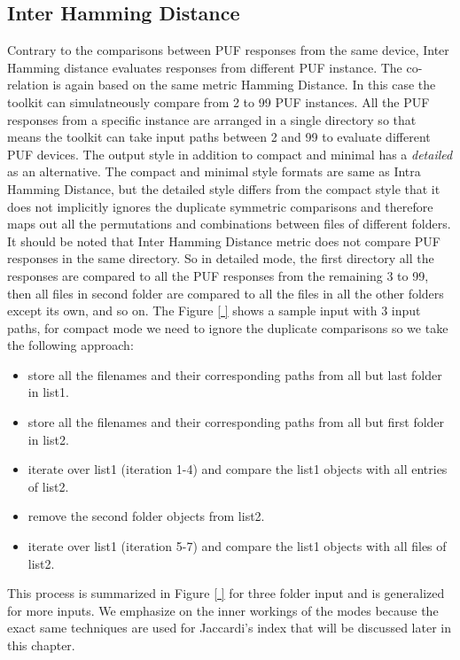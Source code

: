 \subsection{Inter Hamming Distance}
Contrary to the comparisons between PUF responses from the same device, Inter Hamming distance evaluates responses from different PUF instance. The co-relation is again based on the same metric Hamming Distance. In this case the toolkit can simulatneously compare from 2 to 99 PUF instances. All the PUF responses from a specific instance are arranged in a single directory so that means the toolkit can take input paths between 2 and 99 to evaluate different PUF devices. The output
style in addition to compact and minimal has a \emph{detailed} as an alternative. The compact and minimal style formats are same as Intra Hamming Distance, but the detailed style differs from the compact style that it does not implicitly ignores the duplicate symmetric comparisons and therefore maps out all the permutations and combinations between files of different folders. It should be noted that Inter Hamming Distance metric does not compare PUF responses in the same directory. So
in detailed mode, the first directory all the responses are compared to all the PUF responses from the remaining 3 to 99, then all files in second folder are compared to all the files in all the other folders except its own, and so on. The Figure \ref{ } shows a sample input with 3 input paths, for compact mode we need to ignore the duplicate comparisons so we take the following approach:
\begin{itemize}
	\item store all the filenames and their corresponding paths from all but last folder in list1.
	\item store all the filenames and their corresponding paths from all but first folder in list2.
	\item iterate over list1 (iteration 1-4) and compare the list1 objects with all entries of list2.
	\item remove the second folder objects from list2.
	\item iterate over list1 (iteration 5-7) and compare the list1 objects with all files of list2.
\end{itemize}

This process is summarized in Figure \ref{ } for three folder input and is generalized for more inputs. We emphasize on the inner workings of the modes because the exact same techniques are used for Jaccardi's index that will be discussed later in this chapter.\\

